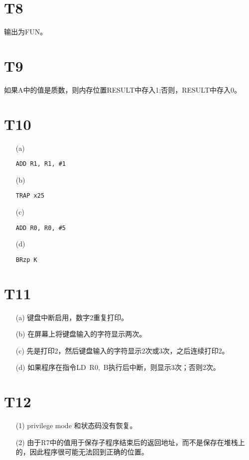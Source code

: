 \documentclass{article}
\begin{document}
\section*{T8}
输出为FUN。


\section*{T9}
如果A中的值是质数，则内存位置RESULT中存入1;否则，RESULT中存入0。


\section*{T10}
\begin{enumerate}
    \item [(a)]
    \begin{lstlisting}[basicstyle=\ttfamily,language={[x86masm]Assembler}]
        ADD R1, R1, #1
    \end{lstlisting}

    \item [(b)]
    \begin{lstlisting}[basicstyle=\ttfamily,language={[x86masm]Assembler}]
        TRAP x25
    \end{lstlisting}

    \item [(c)]
    \begin{lstlisting}[basicstyle=\ttfamily,language={[x86masm]Assembler}]
        ADD R0, R0, #5
    \end{lstlisting}

    \item [(d)]
    \begin{lstlisting}[basicstyle=\ttfamily,language={[x86masm]Assembler}]
        BRzp K
    \end{lstlisting}
\end{enumerate}

\section*{T11}
\begin{enumerate}
    \item [(a)]键盘中断启用，数字2重复打印。
    \item [(b)]在屏幕上将键盘输入的字符显示两次。
    \item [(c)]先是打印2，然后键盘输入的字符显示2次或3次，之后连续打印2。
    \item [(d)]如果程序在指令LD\ R0,\ B执行后中断，则显示3次；否则2次。
\end{enumerate}


\section*{T12}
\begin{enumerate}
    \item [(1)]privilege mode 和状态码没有恢复。
    \item [(2)]由于R7中的值用于保存子程序结束后的返回地址，而不是保存在堆栈上的，因此程序很可能无法回到正确的位置。
\end{enumerate}
\end{document}
